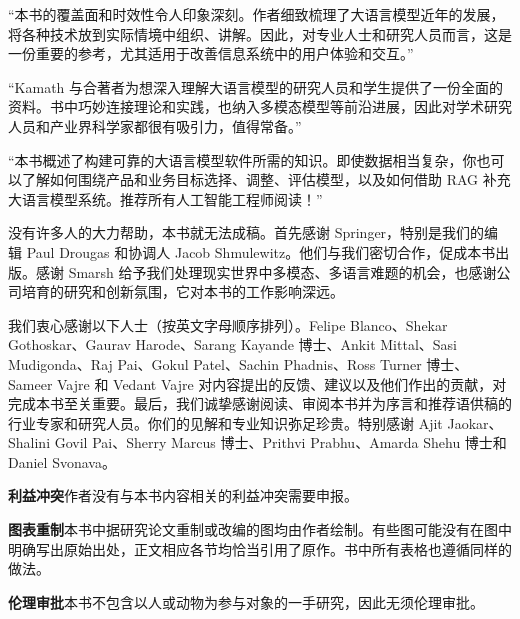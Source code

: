 “本书的覆盖面和时效性令人印象深刻。作者细致梳理了大语言模型近年的发展，将各种技术放到实际情境中组织、讲解。因此，对专业人士和研究人员而言，这是一份重要的参考，尤其适用于改善信息系统中的用户体验和交互。”

“Kamath 与合著者为想深入理解大语言模型的研究人员和学生提供了一份全面的资料。书中巧妙连接理论和实践，也纳入多模态模型等前沿进展，因此对学术研究人员和产业界科学家都很有吸引力，值得常备。”

“本书概述了构建可靠的大语言模型软件所需的知识。即使数据相当复杂，你也可以了解如何围绕产品和业务目标选择、调整、评估模型，以及如何借助 RAG 补充大语言模型系统。推荐所有人工智能工程师阅读！”



没有许多人的大力帮助，本书就无法成稿。首先感谢 Springer，特别是我们的编辑 Paul Drougas 和协调人 Jacob Shmulewitz。他们与我们密切合作，促成本书出版。感谢 Smarsh 给予我们处理现实世界中多模态、多语言难题的机会，也感谢公司培育的研究和创新氛围，它对本书的工作影响深远。

我们衷心感谢以下人士（按英文字母顺序排列）。Felipe Blanco、Shekar Gothoskar、Gaurav Harode、Sarang Kayande 博士、Ankit Mittal、Sasi Mudigonda、Raj Pai、Gokul Patel、Sachin Phadnis、Ross Turner 博士、Sameer Vajre 和 Vedant Vajre 对内容提出的反馈、建议以及他们作出的贡献，对完成本书至关重要。最后，我们诚挚感谢阅读、审阅本书并为序言和推荐语供稿的行业专家和研究人员。你们的见解和专业知识弥足珍贵。特别感谢 Ajit Jaokar、Shalini Govil Pai、Sherry Marcus 博士、Prithvi Prabhu、Amarda Shehu 博士和 Daniel Svonava。

\noindent\textbf{利益冲突}\enspace 作者没有与本书内容相关的利益冲突需要申报。

\noindent\textbf{图表重制}\enspace 本书中据研究论文重制或改编的图均由作者绘制。有些图可能没有在图中明确写出原始出处，正文相应各节均恰当引用了原作。书中所有表格也遵循同样的做法。

\noindent\textbf{伦理审批}\enspace 本书不包含以人或动物为参与对象的一手研究，因此无须伦理审批。


\clearpage
{}
\tableofcontents

